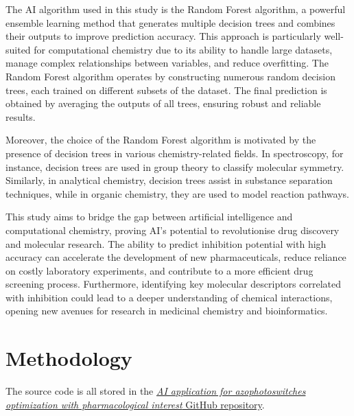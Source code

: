 \documentclass[12pt,letterpaper]{article}
\begin{document}
\begin{multicols}{2}
The AI algorithm used in this study is the Random Forest algorithm\cite{MachineLearningRandomForest}, a powerful ensemble learning method that generates multiple decision trees and combines their outputs to improve prediction accuracy. This approach is particularly well-suited for computational chemistry due to its ability to handle large datasets, manage complex relationships between variables, and reduce overfitting. The Random Forest algorithm operates by constructing numerous random decision trees, each trained on different subsets of the dataset. The final prediction is obtained by averaging the outputs of all trees, ensuring robust and reliable results.

Moreover, the choice of the Random Forest algorithm is motivated by the presence of decision trees in various chemistry-related fields. In spectroscopy, for instance, decision trees are used in group theory to classify molecular symmetry. Similarly, in analytical chemistry, decision trees assist in substance separation techniques, while in organic chemistry, they are used to model reaction pathways.\par

This study aims to bridge the gap between artificial intelligence and computational chemistry, proving AI’s potential to revolutionise drug discovery and molecular research. The ability to predict inhibition potential with high accuracy can accelerate the development of new pharmaceuticals, reduce reliance on costly laboratory experiments, and contribute to a more efficient drug screening process. Furthermore, identifying key molecular descriptors correlated with inhibition could lead to a deeper understanding of chemical interactions, opening new avenues for research in medicinal chemistry and bioinformatics.

\section{Methodology}
The source code is all stored in the \href{https://github.com/SirSergi0/Repository---AI-application-for-azophotoswitches-optimization-with-pharmacological-interest}{\emph{AI application for azophotoswitches optimization with pharmacological interest} GitHub repository}\cite{GitHub}.


\end{multicols}
\end{document}

